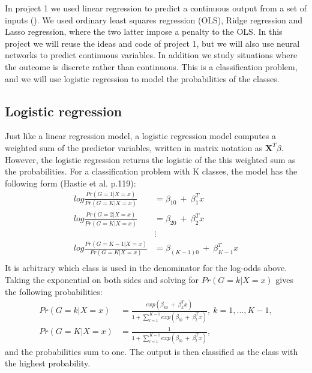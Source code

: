 In project 1 we used linear regression to predict a continuous output from a set of inputs (). We used ordinary least squares regression (OLS), Ridge regression and Lasso regression, where the two latter impose a penalty to the OLS. In this project we will reuse the ideas and code of project 1, but we will also use neural networks to predict continuous variables. In addition we study situations where the outcome is discrete rather than continuous. This is a classification problem, and we will use logistic regression to model the probabilities of the classes.\\

\subsection{Logistic regression}
Just like a linear regression model, a logistic regression model computes a weighted sum of the predictor variables, written in matrix notation as $\bm{X}^T\beta$. However, the logistic regression returns the logistic of the this weighted sum as the probabilities. For a classification problem with K classes, the model has the following form (Hastie et al. p.119):\\
\begin{equation}\label{eqT:logreg_def}
\begin{split}
log\frac{Pr(G=1|X=x)}{Pr(G=K|X=x)} &= \beta_{10}\ +\ \beta_{1}^Tx\\
log\frac{Pr(G=2|X=x)}{Pr(G=K|X=x)} &= \beta_{20}\ +\ \beta_{2}^Tx\\
&\vdots\\
log\frac{Pr(G=K-1|X=x)}{Pr(G=K|X=x)} &= \beta_{(K-1)0}\ +\ \beta_{K-1}^Tx\\
\end{split}
\end{equation}
It is arbitrary which class is used in the denominator for the log-odds above. Taking the exponential on both sides and solving for $Pr(G=k|X=x)$ gives the following probabilities:\\
\begin{equation}\label{eqT:logreg_prob}
\begin{split}
Pr(G=k|X=x) &= \frac{exp(\beta_{k0}\ +\ \beta_{k}^Tx)}{1+\sum_{l=1}^{K-1}exp(\beta_{l0}\ +\ \beta_{l}^Tx)},\ k=1,...,K-1,\\
Pr(G=K|X=x) &= \frac{1}{1+\sum_{l=1}^{K-1}exp(\beta_{l0}\ +\ \beta_{l}^Tx)},
\end{split}
\end{equation}
and the probabilities sum to one. The output is then classified as the class with the highest probability.\\

